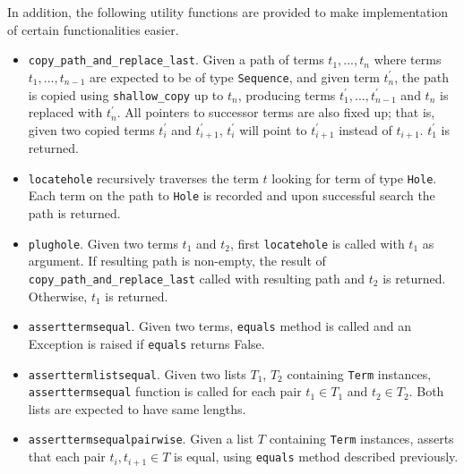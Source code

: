 In addition, the following utility functions are provided to make implementation of certain functionalities easier.

\begin{itemize}
\item
	\texttt{copy\_path\_and\_replace\_last}. Given a path of terms $t_1, ..., t_n$  where terms $t_1, ..., t_{n-1}$ are expected to be of type \texttt{Sequence}, and given term $t_n^{\prime}$, the path is copied using \texttt{shallow\_copy} up to $t_n$, producing terms $t_1^\prime, ..., t_{n-1}^\prime$ and $t_n$ is replaced with $t_n^{\prime}$. All pointers to successor terms are also fixed up; that is, given two copied terms $t_i^{\prime}$ and $t_{i+1}^{\prime}$, $t_i^{\prime}$ will point to $t_{i+1}^{\prime}$ instead of $t_{i+1}$. $t_1^\prime$ is returned.
\item
	\texttt{locatehole} recursively traverses the term $t$ looking for term of type \texttt{Hole}. Each term on the path to \texttt{Hole} is recorded and upon successful search the path is returned.
\item
	\texttt{plughole}. Given two terms $t_1$ and $t_2$, first \texttt{locatehole} is called with $t_1$ as argument. If resulting path is non-empty, the result of \texttt{copy\_path\_and\_replace\_last} called with resulting path and $t_2$ is returned. Otherwise, $t_1$ is returned.
\item
	\texttt{asserttermsequal}. Given two terms, \texttt{equals} method is called and an Exception is raised if \texttt{equals} returns False.
\item
	\texttt{asserttermlistsequal}. Given two lists $T_1$, $T_2$ containing \texttt{Term} instances, \\ \texttt{asserttermsequal} function is called for each pair $t_1 \in T_1$ and $t_2 \in T_2$. Both lists are expected to have same lengths.
\item 
	\texttt{asserttermsequalpairwise}. Given a list $T$ containing \texttt{Term} instances, asserts that each pair $t_i, t_{i+1} \in T$ is equal, using \texttt{equals} method described previously.
\end{itemize}
